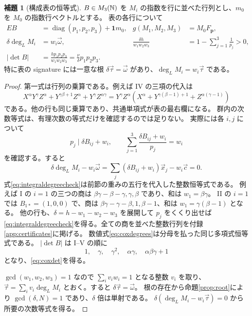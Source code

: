 \documentclass[11pt,a4paper]{ltjsarticle}
\numberwithin{equation}{section}
\theoremstyle{definition}
\newtheorem{lemma}[theorem]{補題}
\newcommand{\cc}{\vec c}\newcommand{\xx}{\vec x}\newcommand{\om}{\vec\omega}\newcommand{\ta}{\vec\tau}
\newcommand{\bp}{\mathbf p}\newcommand{\bw}{\mathbf w}\newcommand{\one}{\mathbf 1}
\begin{document}
\begin{lemma}[構成表の恒等式]\label{lem:coxidentities}
$B\in M_3(\mathbb N)$ を $M_i$ の指数を行に並べた行列とし、$m_0$ を $M_0$ の指数行ベクトルとする。
表の各行について
\begin{align}
 E B&=\operatorname{diag}(p_1,p_2,p_3)+\one m_0,
 &g(M_1,M_2,M_3)&=M_0F_{\bp},\label{eq:coxidentity}\\
 \delta\deg_L M_i&=w_i\om,
 &\frac{\delta h}{w_1w_2w_3}&=1-\sum_{j=1}^3\frac1{p_j}>0,\label{eq:coxdegrees}\\
 |\det B|&=\frac{h p_1p_2p_3}{w_1w_2w_3}
 =\frac\nu\delta p_1p_2p_3.\label{eq:coxdet}
\end{align}
特に表の signature には一意な根 $\delta\ta=\om$ があり、$\deg_L M_i=w_i\ta$ である。
\end{lemma}
\begin{proof}
第一式は行列の乗算である。例えば IV の三項の代入は
\[
 X^\alpha Y^\gamma Z^\alpha+Y^{\gamma\beta+1}Z^\alpha
 +Y^\gamma Z^{\alpha\gamma}
 =Y^\gamma Z^\alpha
   (X^\alpha+Y^{\gamma(\beta-1)+1}+Z^{\alpha(\gamma-1)})
\]
である。他の行も同じ乗算であり、共通単項式が表の最右欄になる。
群内の次数等式は、有理次数の等式だけを確認するのでは足りない。
実際には各 $i,j$ について
\begin{equation}\label{eq:integraldegreecheck}
 p_j\mid\delta B_{ij}+w_i,
 \qquad
 \sum_{j=1}^3\frac{\delta B_{ij}+w_i}{p_j}=w_i
\end{equation}
を確認する。すると
\[
 \delta\deg_L M_i-w_i\om
 =\sum_j(\delta B_{ij}+w_i)\xx_j-w_i\cc=0.
\]
式\eqref{eq:integraldegreecheck}は前節の重みの五行を代入した整数恒等式である。
例えば I の $i=1$ の三つの商は
$\beta\gamma-\beta-\gamma,\gamma,\beta$ であり、和は $w_1=\beta\gamma$。
II の $i=1$ では $B_{1*}=(1,0,0)$ で、商は
$\beta\gamma-\gamma-\beta,1,\beta-1$、和は $w_1=\gamma(\beta-1)$ となる。
他の行も、$\delta=h-w_1-w_2-w_3$ を展開して $p_j$ をくくり出せば\eqref{eq:integraldegreecheck}を得る。全ての商を並べた整数行列を付録\ref{app:certificates}に掲げる。
数値式\eqref{eq:coxdegrees}は分母を払った同じ多項式恒等式である。
$|\det B|$ は I--V の順に
\[
 1,\quad\gamma,\quad\gamma^2,\quad\alpha\gamma,\quad\alpha\beta\gamma+1
\]
となり、\eqref{eq:coxdet}を得る。

$\gcd(w_1,w_2,w_3)=1$ なので $\sum_i v_iw_i=1$ となる整数 $v_i$ を取り、
$\ta=\sum_i v_i\deg_L M_i$ とおく。すると $\delta\ta=\om$。
根の存在から命題\ref{prop:root}により $\gcd(\delta,N)=1$ であり、$\delta$ 倍は単射である。
$\delta(\deg_L M_i-w_i\ta)=0$ から所要の次数等式を得る。
\end{proof}
\end{document}
